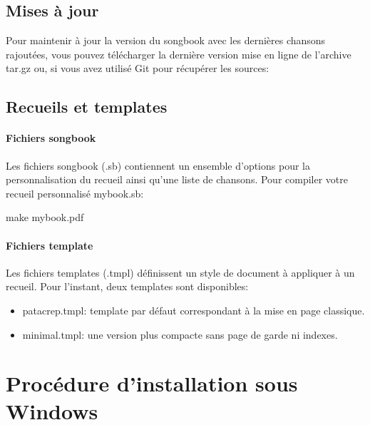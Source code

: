 \documentclass[versionenligne]{patacrep}
\begin{document}
\subsection{Mises à jour}

Pour maintenir à jour la version du songbook avec les dernières
chansons rajoutées, vous pouvez télécharger la dernière version mise
en ligne de l'archive tar.gz ou, si vous avez utilisé Git pour
récupérer les sources:

\subsection{Recueils et templates}

\paragraph{Fichiers songbook}
Les fichiers songbook (.sb) contiennent un ensemble d'options pour la
personnalisation du recueil ainsi qu'une liste de chansons. Pour
compiler votre recueil personnalisé mybook.sb:

\begin{unixcom}
  make mybook.pdf
\end{unixcom}

\paragraph{Fichiers template}
Les fichiers templates (.tmpl) définissent un style de document à
appliquer à un recueil. Pour l'instant, deux templates sont disponibles:
\begin{itemize}
\item patacrep.tmpl: template par défaut correspondant à la mise en page classique.
\item minimal.tmpl: une version plus compacte sans page de garde ni indexes.
\end{itemize}

\section{Procédure d'installation sous Windows}
\end{document}
